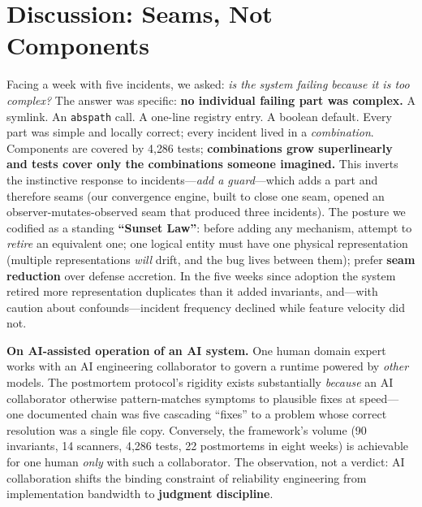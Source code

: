 \documentclass[conference]{IEEEtran}
\begin{document}
\section{Discussion: Seams, Not Components}\label{sec:discussion}
Facing a week with five incidents, we asked: \emph{is the system failing
because it is too complex?} The answer was specific: \textbf{no individual
failing part was complex.} A symlink. An \texttt{abspath} call. A one-line
registry entry. A boolean default. Every part was simple and locally
correct; every incident lived in a \emph{combination}. Components are
covered by 4{,}286 tests; \textbf{combinations grow superlinearly and
tests cover only the combinations someone imagined.} This inverts the
instinctive response to incidents---\emph{add a guard}---which adds a part
and therefore seams (our convergence engine, built to close one seam,
opened an observer-mutates-observed seam that produced three incidents).
The posture we codified as a standing \textbf{``Sunset Law''}: before
adding any mechanism, attempt to \emph{retire} an equivalent one; one
logical entity must have one physical representation (multiple
representations \emph{will} drift, and the bug lives between them); prefer
\textbf{seam reduction} over defense accretion. In the five weeks since
adoption the system retired more representation duplicates than it added
invariants, and---with caution about confounds---incident frequency
declined while feature velocity did not.

\textbf{On AI-assisted operation of an AI system.} One human domain expert
works with an AI engineering collaborator to govern a runtime powered by
\emph{other} models. The postmortem protocol's rigidity exists
substantially \emph{because} an AI collaborator otherwise pattern-matches
symptoms to plausible fixes at speed---one documented chain was five
cascading ``fixes'' to a problem whose correct resolution was a single
file copy. Conversely, the framework's volume (90 invariants, 14 scanners,
4{,}286 tests, 22 postmortems in eight weeks) is achievable for one human
\emph{only} with such a collaborator. The observation, not a verdict: AI
collaboration shifts the binding constraint of reliability engineering
from implementation bandwidth to \textbf{judgment discipline}.
\end{document}
